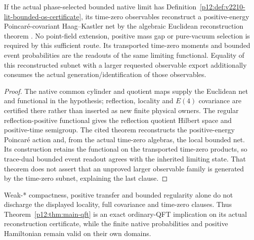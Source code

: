 \documentclass[12pt,a4paper]{article}
\begin{document}
\begin{corollary}
\label{p12:cor:v2210-lit-bounded-os-reconstruction}
If the actual phase-selected bounded native limit has
Definition~\ref{p12:def:v2210-lit-bounded-os-certificate}, its time-zero
observables reconstruct a positive-energy Poincar\'e-covariant Haag--Kastler
net by the algebraic Euclidean reconstruction theorem
\cite{LitQFTSchlingemann1999}. No point-field extension, positive mass
gap or pure-vacuum selection is required by this sufficient route.
Its transported time-zero moments and bounded event probabilities are the
readouts of the same limiting functional. Equality of this reconstructed
subnet with a larger requested observable export additionally consumes
the actual generation/identification of those observables.
\end{corollary}
\begin{proof}
The native common cylinder and quotient maps supply the Euclidean net and
functional in the hypothesis; reflection, locality and $E(4)$ covariance
are certified there rather than inserted as new finite physical owners.
The regular reflection-positive functional gives the reflection quotient
Hilbert space and positive-time semigroup. The cited theorem reconstructs
the positive-energy Poincar\'e action and, from the actual time-zero
algebras, the local bounded net. Its construction retains the functional
on the transported time-zero products, so trace-dual bounded event readout
agrees with the inherited limiting state. That theorem does not assert
that an unproved larger observable family is generated by the time-zero
subnet, explaining the last clause.
\end{proof}
Weak-* compactness, positive transfer and bounded regularity alone do not
discharge the displayed locality, full covariance and time-zero clauses.
Thus Theorem~\ref{p12:thm:main-qft} is an exact ordinary-QFT implication
on its actual reconstruction certificate, while the finite native
probabilities and positive Hamiltonian remain valid on their own domains.
\end{document}
